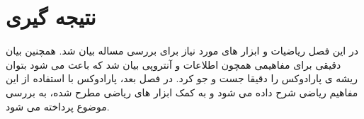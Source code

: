 \section{نتیجه گیری}
در این فصل ریاضیات و ابزار های مورد نیاز برای بررسی مساله بیان شد. همچنین بیان دقیقی برای مفاهیمی همچون اطلاعات و آنتروپی بیان شد که باعث می شود بتوان ریشه ی پارادوکس را دقیقا جست و جو کرد. در فصل بعد، پارادوکس با استفاده از این مفاهیم ریاضی شرح داده می شود و به کمک ابزار های ریاضی مطرح شده، به بررسی موضوع پرداخته می شود.